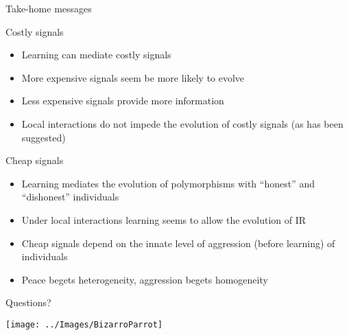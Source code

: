\documentclass[
  ignorenonframetext,
]{beamer}
\providecommand{\tightlist}{%
  \setlength{\itemsep}{0pt}\setlength{\parskip}{0pt}}
\begin{document}
\begin{frame}{Take-home messages}
\protect\hypertarget{take-home-messages}{}

\begin{block}{Costly signals}

\begin{itemize}
\tightlist
\item
  Learning can mediate costly signals
\item
  More expensive signals seem be more likely to evolve
\item
  Less expensive signals provide more information
\item
  Local interactions do not impede the evolution of costly signals (as
  has been suggested)
\end{itemize}

\end{block}

\begin{block}{Cheap signals}

\begin{itemize}
\tightlist
\item
  Learning mediates the evolution of polymorphisms with ``honest'' and
  ``dishonest'' individuals
\item
  Under local interactions learning seems to allow the evolution of IR
\item
  Cheap signals depend on the innate level of aggression (before
  learning) of individuals
\item
  Peace begets heterogeneity, aggression begets homogeneity
\end{itemize}

\end{block}

\end{frame}

\begin{frame}{Questions?}
\protect\hypertarget{questions}{}

\begin{center}\texttt{[image: ../Images/BizarroParrot]} \end{center}

\end{frame}
\end{document}
